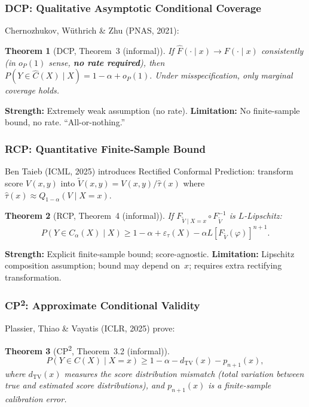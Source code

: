\documentclass[11pt]{article}
\newtheorem{theorem}{Theorem}
\begin{document}
\subsubsection{DCP: Qualitative Asymptotic Conditional Coverage}

Chernozhukov, W\"uthrich \& Zhu (PNAS, 2021):

\begin{theorem}[DCP, Theorem~3 (informal)]
If $\hat F(\cdot \mid x) \to F(\cdot \mid x)$ consistently
(in $o_P(1)$ sense, \textbf{no rate required}), then
$P(Y \in \hat C(X) \mid X) = 1 - \alpha + o_P(1).$
Under misspecification, only marginal coverage holds.
\end{theorem}

\textbf{Strength:} Extremely weak assumption (no rate).
\textbf{Limitation:} No finite-sample bound, no rate. ``All-or-nothing.''

\subsubsection{RCP: Quantitative Finite-Sample Bound}

Ben Taieb (ICML, 2025) introduces Rectified Conformal Prediction:
transform score $V(x,y)$ into $\tilde V(x,y) = V(x,y) / \hat\tau(x)$
where $\hat\tau(x) \approx Q_{1-\alpha}(V \mid X = x)$.

\begin{theorem}[RCP, Theorem~4 (informal)]
If $F_{\tilde V \mid X=x} \circ F_{\tilde V}^{-1}$ is $L$-Lipschitz:
\[
  P(Y \in C_\alpha(X) \mid X)
  \ge 1 - \alpha + \varepsilon_\tau(X)
  - \alpha L [F_{\tilde V}(\varphi)]^{n+1}.
\]
\end{theorem}

\textbf{Strength:} Explicit finite-sample bound; score-agnostic.
\textbf{Limitation:} Lipschitz composition assumption; bound may depend
on~$x$; requires extra rectifying transformation.

\subsubsection{CP\textsuperscript{2}: Approximate Conditional Validity}

Plassier, Thiao \& Vayatis (ICLR, 2025) prove:

\begin{theorem}[CP\textsuperscript{2}, Theorem~3.2 (informal)]
\[
  P(Y \in C(X) \mid X = x)
  \ge 1 - \alpha - d_{\mathrm{TV}}(x) - p_{n+1}(x),
\]
where $d_{\mathrm{TV}}(x)$ measures the score distribution mismatch
(total variation between true and estimated score distributions), and
$p_{n+1}(x)$ is a finite-sample calibration error.
\end{theorem}
\end{document}

